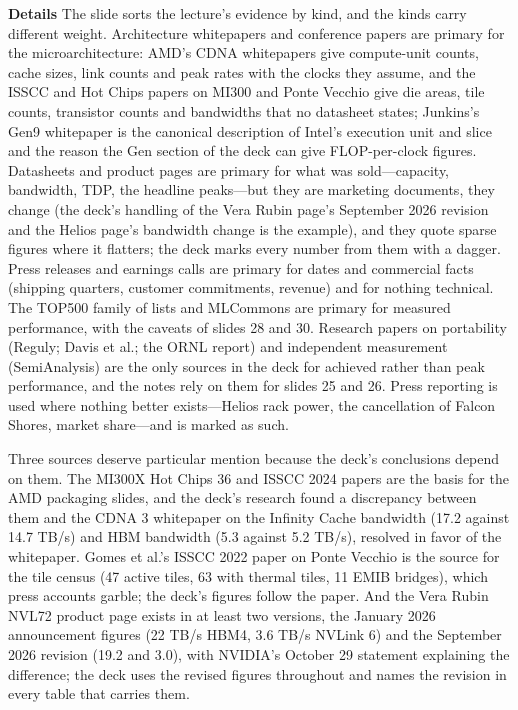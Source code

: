 \documentclass[11pt,letterpaper]{article}
\newcommand{\para}[1]{\medskip\noindent\textbf{#1}\quad}
\begin{document}
\para{Details} The slide sorts the lecture's evidence by kind, and the kinds carry different weight. Architecture whitepapers and conference papers are primary for the microarchitecture: AMD's CDNA whitepapers give compute-unit counts, cache sizes, link counts and peak rates with the clocks they assume, and the ISSCC and Hot Chips papers on MI300 and Ponte Vecchio give die areas, tile counts, transistor counts and bandwidths that no datasheet states; Junkins's Gen9 whitepaper is the canonical description of Intel's execution unit and slice and the reason the Gen section of the deck can give FLOP-per-clock figures. Datasheets and product pages are primary for what was sold---capacity, bandwidth, TDP, the headline peaks---but they are marketing documents, they change (the deck's handling of the Vera Rubin page's September 2026 revision and the Helios page's bandwidth change is the example), and they quote sparse figures where it flatters; the deck marks every number from them with a dagger. Press releases and earnings calls are primary for dates and commercial facts (shipping quarters, customer commitments, revenue) and for nothing technical. The TOP500 family of lists and MLCommons are primary for measured performance, with the caveats of slides 28 and 30. Research papers on portability (Reguly; Davis et al.; the ORNL report) and independent measurement (SemiAnalysis) are the only sources in the deck for achieved rather than peak performance, and the notes rely on them for slides 25 and 26. Press reporting is used where nothing better exists---Helios rack power, the cancellation of Falcon Shores, market share---and is marked as such.

Three sources deserve particular mention because the deck's conclusions depend on them. The MI300X Hot Chips 36 and ISSCC 2024 papers are the basis for the AMD packaging slides, and the deck's research found a discrepancy between them and the CDNA 3 whitepaper on the Infinity Cache bandwidth (17.2 against 14.7 TB/s) and HBM bandwidth (5.3 against 5.2 TB/s), resolved in favor of the whitepaper. Gomes et al.'s ISSCC 2022 paper on Ponte Vecchio is the source for the tile census (47 active tiles, 63 with thermal tiles, 11 EMIB bridges), which press accounts garble; the deck's figures follow the paper. And the Vera Rubin NVL72 product page exists in at least two versions, the January 2026 announcement figures (22 TB/s HBM4, 3.6 TB/s NVLink 6) and the September 2026 revision (19.2 and 3.0), with NVIDIA's October 29 statement explaining the difference; the deck uses the revised figures throughout and names the revision in every table that carries them.
\end{document}
